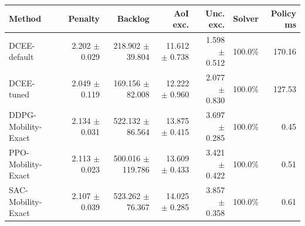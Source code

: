 \begin{tabular}{lrrrrrr}
\toprule
Method & Penalty & Backlog & AoI exc. & Unc. exc. & Solver & Policy ms \\
\midrule
DCEE-default & 2.202 $\pm$ 0.029 & 218.902 $\pm$ 39.804 & 11.612 $\pm$ 0.738 & 1.598 $\pm$ 0.512 & 100.0\% & 170.16 \\
DCEE-tuned & 2.049 $\pm$ 0.119 & 169.156 $\pm$ 82.008 & 12.222 $\pm$ 0.960 & 2.077 $\pm$ 0.830 & 100.0\% & 127.53 \\
DDPG-Mobility-Exact & 2.134 $\pm$ 0.031 & 522.132 $\pm$ 86.564 & 13.875 $\pm$ 0.415 & 3.697 $\pm$ 0.285 & 100.0\% & 0.45 \\
PPO-Mobility-Exact & 2.113 $\pm$ 0.023 & 500.016 $\pm$ 119.786 & 13.609 $\pm$ 0.433 & 3.421 $\pm$ 0.422 & 100.0\% & 0.51 \\
SAC-Mobility-Exact & 2.107 $\pm$ 0.039 & 523.262 $\pm$ 76.367 & 14.025 $\pm$ 0.285 & 3.857 $\pm$ 0.358 & 100.0\% & 0.61 \\
\bottomrule
\end{tabular}
